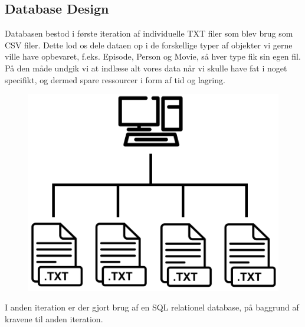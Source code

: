 \newpage
\subsection{Database Design}
Databasen bestod i første iteration af individuelle TXT filer som blev brug som CSV filer. Dette lod os dele dataen op i de forskellige typer af objekter vi gerne ville have opbevaret, f.eks. Episode, Person og Movie, så hver type fik sin egen fil. På den måde undgik vi at indlæse alt vores data når vi skulle have fat i noget specifikt, og dermed spare ressourcer i form af tid og lagring.

\begin{figure}[H]
    \centering
\includegraphics[scale = 0.7]{images/computer_to_txt_file_icon.png}
\end{figure}

I anden iteration er der gjort brug af en SQL relationel database, på baggrund af kravene til anden iteration. 